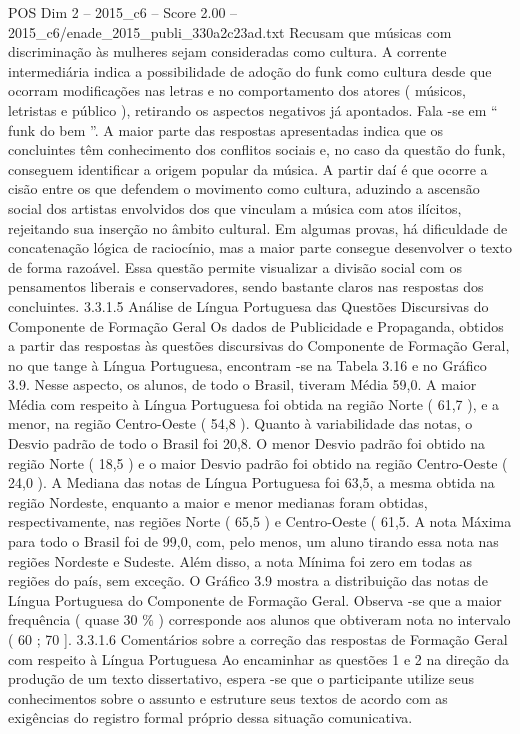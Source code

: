 \begin{textsample}{POS Dim 2 – 2015\_c6 – Score 2.00 – 2015\_c6/enade\_2015\_publi\_330a2c23ad.txt}
Recusam que músicas com discriminação às mulheres sejam consideradas como cultura.
A corrente intermediária indica a possibilidade de adoção do funk como cultura desde que ocorram modificações nas letras e no comportamento dos atores ( músicos, letristas e público ), retirando os aspectos negativos já apontados.
Fala -se em “ funk do bem ”.
A maior parte das respostas apresentadas indica que os concluintes têm conhecimento dos conflitos sociais e, no caso da questão do funk, conseguem identificar a origem popular da música.
A partir daí é que ocorre a cisão entre os que defendem o movimento como cultura, aduzindo a ascensão social dos artistas envolvidos dos que vinculam a música com atos ilícitos, rejeitando sua inserção no âmbito cultural.
Em algumas provas, há dificuldade de concatenação lógica de raciocínio, mas a maior parte consegue desenvolver o texto de forma razoável.
Essa questão permite visualizar a divisão social com os pensamentos liberais e conservadores, sendo bastante claros nas respostas dos concluintes. 3.3.1.5 Análise de Língua Portuguesa das Questões Discursivas do Componente de Formação Geral Os dados de Publicidade e Propaganda, obtidos a partir das respostas às questões discursivas do Componente de Formação Geral, no que tange à Língua Portuguesa, encontram -se na Tabela 3.16 e no Gráfico 3.9.
Nesse aspecto, os alunos, de todo o Brasil, tiveram Média 59,0.
A maior Média com respeito à Língua Portuguesa foi obtida na região Norte ( 61,7 ), e a menor, na região Centro-Oeste ( 54,8 ).
Quanto à variabilidade das notas, o Desvio padrão de todo o Brasil foi 20,8.
O menor Desvio padrão foi obtido na região Norte ( 18,5 ) e o maior Desvio padrão foi obtido na região Centro-Oeste ( 24,0 ).
A Mediana das notas de Língua Portuguesa foi 63,5, a mesma obtida na região Nordeste, enquanto a maior e menor medianas foram obtidas, respectivamente, nas regiões Norte ( 65,5 ) e Centro-Oeste ( 61,5.
A nota Máxima para todo o Brasil foi de 99,0, com, pelo menos, um aluno tirando essa nota nas regiões Nordeste e Sudeste.
Além disso, a nota Mínima foi zero em todas as regiões do país, sem exceção.
O Gráfico 3.9 mostra a distribuição das notas de Língua Portuguesa do Componente de Formação Geral.
Observa -se que a maior frequência ( quase 30 \% ) corresponde aos alunos que obtiveram nota no intervalo ( 60 ; 70 ]. 3.3.1.6 Comentários sobre a correção das respostas de Formação Geral com respeito à Língua Portuguesa Ao encaminhar as questões 1 e 2 na direção da produção de um texto dissertativo, espera -se que o participante utilize seus conhecimentos sobre o assunto e estruture seus textos de acordo com as exigências do registro formal próprio dessa situação comunicativa.

\end{textsample}

